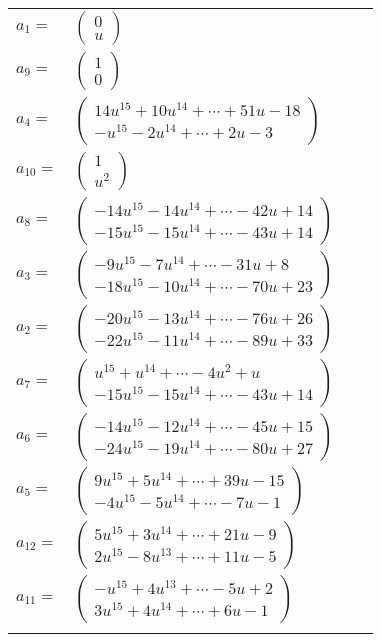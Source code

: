 \documentclass[1p]{elsarticle_modified}
\theoremstyle{definition}
\begin{document}
\begin{tabular}{m{7pt} m{180pt} m{7pt} m{180pt} }
\flushright $a_{1}=$&$\begin{pmatrix}0\\u\end{pmatrix}$ \\
\flushright $a_{9}=$&$\begin{pmatrix}1\\0\end{pmatrix}$ \\
\flushright $a_{4}=$&$\begin{pmatrix}14 u^{15}+10 u^{14}+\cdots+51 u-18\\- u^{15}-2 u^{14}+\cdots+2 u-3\end{pmatrix}$ \\
\flushright $a_{10}=$&$\begin{pmatrix}1\\u^2\end{pmatrix}$ \\
\flushright $a_{8}=$&$\begin{pmatrix}-14 u^{15}-14 u^{14}+\cdots-42 u+14\\-15 u^{15}-15 u^{14}+\cdots-43 u+14\end{pmatrix}$ \\
\flushright $a_{3}=$&$\begin{pmatrix}-9 u^{15}-7 u^{14}+\cdots-31 u+8\\-18 u^{15}-10 u^{14}+\cdots-70 u+23\end{pmatrix}$ \\
\flushright $a_{2}=$&$\begin{pmatrix}-20 u^{15}-13 u^{14}+\cdots-76 u+26\\-22 u^{15}-11 u^{14}+\cdots-89 u+33\end{pmatrix}$ \\
\flushright $a_{7}=$&$\begin{pmatrix}u^{15}+u^{14}+\cdots-4 u^2+u\\-15 u^{15}-15 u^{14}+\cdots-43 u+14\end{pmatrix}$ \\
\flushright $a_{6}=$&$\begin{pmatrix}-14 u^{15}-12 u^{14}+\cdots-45 u+15\\-24 u^{15}-19 u^{14}+\cdots-80 u+27\end{pmatrix}$ \\
\flushright $a_{5}=$&$\begin{pmatrix}9 u^{15}+5 u^{14}+\cdots+39 u-15\\-4 u^{15}-5 u^{14}+\cdots-7 u-1\end{pmatrix}$ \\
\flushright $a_{12}=$&$\begin{pmatrix}5 u^{15}+3 u^{14}+\cdots+21 u-9\\2 u^{15}-8 u^{13}+\cdots+11 u-5\end{pmatrix}$ \\
\flushright $a_{11}=$&$\begin{pmatrix}- u^{15}+4 u^{13}+\cdots-5 u+2\\3 u^{15}+4 u^{14}+\cdots+6 u-1\end{pmatrix}$\\&\end{tabular}
\end{document}
